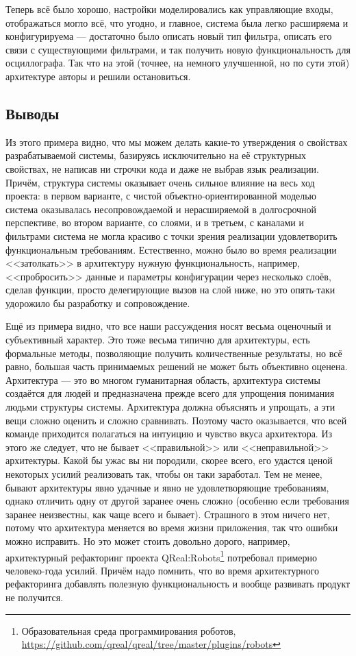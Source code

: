 \documentclass{../../text-style}
\begin{document}
Теперь всё было хорошо, настройки моделировались как управляющие входы, отображаться могло всё, что угодно, и главное, система была легко расширяема и конфигурируема --- достаточно было описать новый тип фильтра, описать его связи с существующими фильтрами, и так получить новую функциональность для осциллографа. Так что на этой (точнее, на немного улучшенной, но по сути этой) архитектуре авторы и решили остановиться.

\subsection{Выводы}

Из этого примера видно, что мы можем делать какие-то утверждения о свойствах разрабатываемой системы, базируясь исключительно на её структурных свойствах, не написав ни строчки кода и даже не выбрав язык реализации. Причём, структура системы оказывает очень сильное влияние на весь ход проекта: в первом варианте, с чистой объектно-ориентированной моделью система оказывалась несопровождаемой и нерасширяемой в долгосрочной перспективе, во втором варианте, со слоями, и в третьем, с каналами и фильтрами система не могла красиво с точки зрения реализации удовлетворить функциональным требованиям. Естественно, можно было во время реализации <<затолкать>> в архитектуру нужную функциональность, например, <<пробросить>> данные и параметры конфигурации через несколько слоёв, сделав функции, просто делегирующие вызов на слой ниже, но это опять-таки удорожило бы разработку и сопровождение.

Ещё из примера видно, что все наши рассуждения носят весьма оценочный и субъективный характер. Это тоже весьма типично для архитектуры, есть формальные методы, позволяющие получить количественные результаты, но всё равно, большая часть принимаемых решений не может быть объективно оценена. Архитектура --- это во многом гуманитарная область, архитектура системы создаётся для людей и предназначена прежде всего для упрощения понимания людьми структуры системы. Архитектура должна объяснять и упрощать, а эти вещи сложно оценить и сложно сравнивать. Поэтому часто оказывается, что всей команде приходится полагаться на интуицию и чувство вкуса архитектора. Из этого же следует, что не бывает <<правильной>> или <<неправильной>> архитектуры. Какой бы ужас вы ни породили, скорее всего, его удастся ценой некоторых усилий реализовать так, чтобы он таки заработал. Тем не менее, бывают архитектуры явно удачные и явно не удовлетворяющие требованиям, однако отличить одну от другой заранее очень сложно (особенно если требования заранее неизвестны, как чаще всего и бывает). Страшного в этом ничего нет, потому что архитектура меняется во время жизни приложения, так что ошибки можно исправить. Но это может стоить довольно дорого, например, архитектурный рефакторинг проекта QReal:Robots\footnote{Образовательная среда программирования роботов, \url{https://github.com/qreal/qreal/tree/master/plugins/robots}} потребовал примерно человеко-года усилий. Причём надо помнить, что во время архитектурного рефакторинга добавлять полезную функциональность и вообще развивать продукт не получится.
\end{document}
